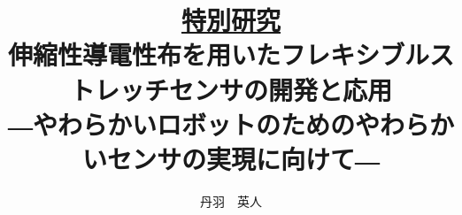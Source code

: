 {\large
\title{\Large{\underline{特別研究}}\\
\vspace{0.5cm}
伸縮性導電性布を用いたフレキシブルストレッチセンサの開発と応用\\
―やわらかいロボットのためのやわらかいセンサの実現に向けて―}}
\author{丹羽　英人}
\maketitle